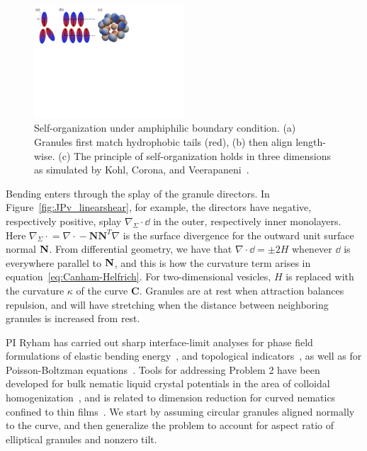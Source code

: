 \begin{figure}
  \vspace{-8pt}
  \centerline{\includegraphics[width=0.5\textwidth]{figures/SA1Figures/AmphiphilicAssembly.pdf}}
  \vspace{-8pt}
  \caption{\label{fig:amphiphilic_assembly} \footnotesize
  Self-organization under amphiphilic boundary condition. (a) Granules
  first match hydrophobic tails (red), (b) then align length-wise. (c)
  The principle of self-organization holds in three dimensions as
  simulated by Kohl, Corona, and
  Veerapaneni~\cite{koh-cor-che-vee2021}.}
\end{figure}
Bending enters through the splay of the granule directors. In
Figure~\ref{fig:JPv_linearshear}, for example, the directors have
negative, respectively positive, splay $\nabla_{\Sigma} \cdot \dd$ in
the outer, respectively inner monolayers. Here $\nabla_{\Sigma}\cdot{} =
\nabla \cdot {} - \mathbf{N}\mathbf{N}^T \nabla$ is the surface
divergence for the outward unit surface normal $\mathbf{N}$. From differential
geometry, we have that $\nabla\cdot \dd = \pm 2H$ whenever $\dd$ is
everywhere parallel to $\mathbf{N}$, and this is how the curvature term arises
in equation~\eqref{eq:Canham-Helfrich}. For two-dimensional vesicles,
$H$ is replaced with the curvature $\kappa$ of the curve $\mathbf{C}$.
Granules are at rest when attraction balances repulsion, and will have
stretching when the distance between neighboring granules is increased
from rest.

PI Ryham has carried out sharp interface-limit analyses for phase field
formulations of elastic bending energy~\cite{0951-7715-18-3-016, Du05},
and topological indicators~\cite{DuEuler}, as well as for
Poisson-Boltzman equations~\cite{Lee2018, 1531-3492_2006_2_357}. Tools
for addressing Problem 2 have been developed for bulk nematic liquid
crystal potentials in the area of colloidal
homogenization~\cite{Canevari2019DesignOE, doi:10.1137/18M1163919,
doi:10.1137/18M1163919, BERLYAND200597, doi:10.1137/130910348}, and is
related to dimension reduction for curved nematics confined to thin
films~\cite{Golovaty2017DimensionRF, Golovaty2015DimensionRF,
doi:10.1142/S0218202516500470, FoFrLe07}. We start by assuming circular
granules aligned normally to the curve, and then generalize the problem
to account for aspect ratio of elliptical granules and nonzero tilt. 

